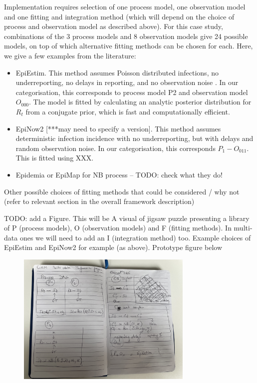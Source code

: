 \documentclass{article}
\begin{document}
Implementation requires selection of one process model, one observation model and one fitting and integration method (which will depend on the choice of process and observation model as described above). For this case study, combinations of the 3 process models and 8 observation models give 24 possible models, on top of which alternative fitting methods can be chosen for each. Here, we give a few examples from the literature:
\begin{itemize}
    \item EpiEstim. This method assumes Poisson distributed infections, no underreporting, no delays in reporting, and no observation noise \citep{cori2013new}. In our categorisation, this corresponds to process model P2 and observation model $O_{000}$. The model is fitted by calculating an analytic posterior distribution for $R_t$ from a conjugate prior, which is fast and computationally efficient. 
    \item EpiNow2 [***may need to specify a version]. This method assumes deterministic infection incidence with no underreporting, but with delays and random observation noise. In our categorisation, this corresponds $P_1-O_{011}$. This is fitted using XXX.
    \item Epidemia or EpiMap for NB process – TODO: check what they do!
\end{itemize}

Other possible choices of fitting methods that could be considered / why not (refer to relevant section in the overall framework description)
 
TODO: add a Figure. This will be A visual of jigsaw puzzle presenting a library of P (process models), O (observation models) and F (fitting methods). In multi-data ones we will need to add an I (integration method) too.
Example choices of EpiEstim and EpiNow2 for example (as above). Prototype figure below

\begin{figure}
\includegraphics[width=0.75\textwidth]{figures/cs0_diagram1.jpg}
\label{fig:CS0_DAGs}
\end{figure}
\end{document}
